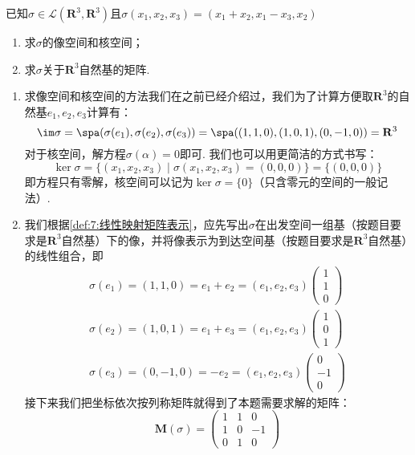 \begin{example}\label{ex:7:矩阵表示1}
    已知$\sigma \in \mathcal{L}(\mathbf{R}^3,\mathbf{R}^3)$且$\sigma(x_1,x_2,x_3)=(x_1+x_2,x_1-x_3, x_2)$
    \begin{enumerate}
        \item 求$\sigma$的像空间和核空间；

        \item 求$\sigma$关于$\mathbf{R}^3$自然基的矩阵.
    \end{enumerate}
\end{example}

\begin{solution}
    \begin{enumerate}
        \item 求像空间和核空间的方法我们在之前已经介绍过，我们为了计算方便取$\mathbf{R}^3$的自然基$e_1,e_2,e_3$计算有：
              \[\im\sigma=\spa(\sigma(e_1),\sigma(e_2),\sigma(e_3))=\spa((1,1,0),(1,0,1),(0,-1,0))=\mathbf{R}^3\]
              对于核空间，解方程$\sigma(\alpha)=0$即可. 我们也可以用更简洁的方式书写：
              \[\ker\sigma=\{(x_1,x_2,x_3)\mid \sigma(x_1,x_2,x_3)=(0,0,0)\}=\{(0,0,0)\}\]
              即方程只有零解，核空间可以记为$\ker\sigma=\{0\}$（只含零元的空间的一般记法）.

        \item 我们根据\autoref{def:7:线性映射矩阵表示}，应先写出$\sigma$在出发空间一组基（按题目要求是$\mathbf{R}^3$自然基）下的像，并将像表示为到达空间基（按题目要求是$\mathbf{R}^3$自然基）的线性组合，即
              \begin{gather*}
                  \sigma(e_1)=(1,1,0)=e_1+e_2=(e_1,e_2,e_3)\begin{pmatrix}
                      1 \\ 1 \\ 0
                  \end{pmatrix} \\
                  \sigma(e_2)=(1,0,1)=e_1+e_3=(e_1,e_2,e_3)\begin{pmatrix}
                      1 \\ 0 \\ 1
                  \end{pmatrix} \\
                  \sigma(e_3)=(0,-1,0)=-e_2=(e_1,e_2,e_3)\begin{pmatrix}
                      0 \\ -1 \\ 0
                  \end{pmatrix}
              \end{gather*}
              接下来我们把坐标依次按列称矩阵就得到了本题需要求解的矩阵：
              \[\mathbf{M}(\sigma)=\begin{pmatrix}
                      1 & 1 & 0  \\
                      1 & 0 & -1 \\
                      0 & 1 & 0
                  \end{pmatrix}\]
    \end{enumerate}
\end{solution}

